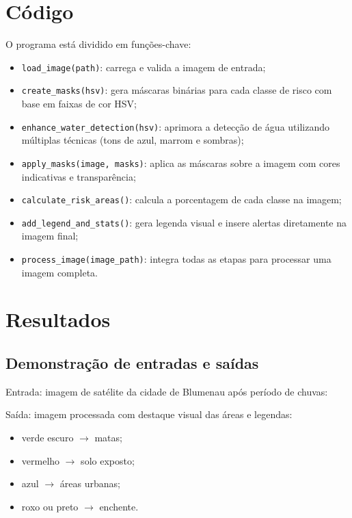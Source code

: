 \documentclass{article}
\begin{document}
\section{Código}

O programa está dividido em funções-chave:

\begin{itemize}
\item \texttt{load\_image(path)}: carrega e valida a imagem de entrada;

\item \texttt{create\_masks(hsv)}: gera máscaras binárias para cada classe de risco com base em faixas de cor HSV;

\item \texttt{enhance\_water\_detection(hsv)}: aprimora a detecção de água utilizando múltiplas técnicas (tons de azul, marrom e sombras);

\item \texttt{apply\_masks(image, masks)}: aplica as máscaras sobre a imagem com cores indicativas e transparência;

\item \texttt{calculate\_risk\_areas()}: calcula a porcentagem de cada classe na imagem;

\item \texttt{add\_legend\_and\_stats()}: gera legenda visual e insere alertas diretamente na imagem final;

\item \texttt{process\_image(image\_path)}: integra todas as etapas para processar uma imagem completa.
\end{itemize}

\section{Resultados}
\subsection{Demonstração de entradas e saídas}

Entrada: imagem de satélite da cidade de Blumenau após período de chuvas:

Saída: imagem processada com destaque visual das áreas e legendas:

\begin{itemize}
    \item verde escuro $\rightarrow$ matas;
    \item vermelho $\rightarrow$ solo exposto;
    \item azul $\rightarrow$ áreas urbanas;
    \item roxo ou preto $\rightarrow$ enchente.
\end{itemize}
\end{document}
